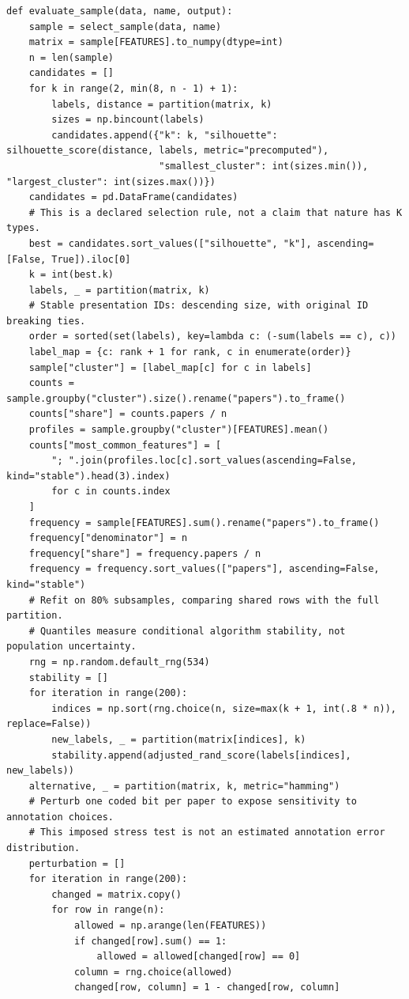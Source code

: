 \begin{Verbatim}[breaklines,breakanywhere,fontsize=\small]
def evaluate_sample(data, name, output):
    sample = select_sample(data, name)
    matrix = sample[FEATURES].to_numpy(dtype=int)
    n = len(sample)
    candidates = []
    for k in range(2, min(8, n - 1) + 1):
        labels, distance = partition(matrix, k)
        sizes = np.bincount(labels)
        candidates.append({"k": k, "silhouette": silhouette_score(distance, labels, metric="precomputed"),
                           "smallest_cluster": int(sizes.min()), "largest_cluster": int(sizes.max())})
    candidates = pd.DataFrame(candidates)
    # This is a declared selection rule, not a claim that nature has K types.
    best = candidates.sort_values(["silhouette", "k"], ascending=[False, True]).iloc[0]
    k = int(best.k)
    labels, _ = partition(matrix, k)
    # Stable presentation IDs: descending size, with original ID breaking ties.
    order = sorted(set(labels), key=lambda c: (-sum(labels == c), c))
    label_map = {c: rank + 1 for rank, c in enumerate(order)}
    sample["cluster"] = [label_map[c] for c in labels]
    counts = sample.groupby("cluster").size().rename("papers").to_frame()
    counts["share"] = counts.papers / n
    profiles = sample.groupby("cluster")[FEATURES].mean()
    counts["most_common_features"] = [
        "; ".join(profiles.loc[c].sort_values(ascending=False, kind="stable").head(3).index)
        for c in counts.index
    ]
    frequency = sample[FEATURES].sum().rename("papers").to_frame()
    frequency["denominator"] = n
    frequency["share"] = frequency.papers / n
    frequency = frequency.sort_values(["papers"], ascending=False, kind="stable")
    # Refit on 80% subsamples, comparing shared rows with the full partition.
    # Quantiles measure conditional algorithm stability, not population uncertainty.
    rng = np.random.default_rng(534)
    stability = []
    for iteration in range(200):
        indices = np.sort(rng.choice(n, size=max(k + 1, int(.8 * n)), replace=False))
        new_labels, _ = partition(matrix[indices], k)
        stability.append(adjusted_rand_score(labels[indices], new_labels))
    alternative, _ = partition(matrix, k, metric="hamming")
    # Perturb one coded bit per paper to expose sensitivity to annotation choices.
    # This imposed stress test is not an estimated annotation error distribution.
    perturbation = []
    for iteration in range(200):
        changed = matrix.copy()
        for row in range(n):
            allowed = np.arange(len(FEATURES))
            if changed[row].sum() == 1:
                allowed = allowed[changed[row] == 0]
            column = rng.choice(allowed)
            changed[row, column] = 1 - changed[row, column]

\end{Verbatim}
